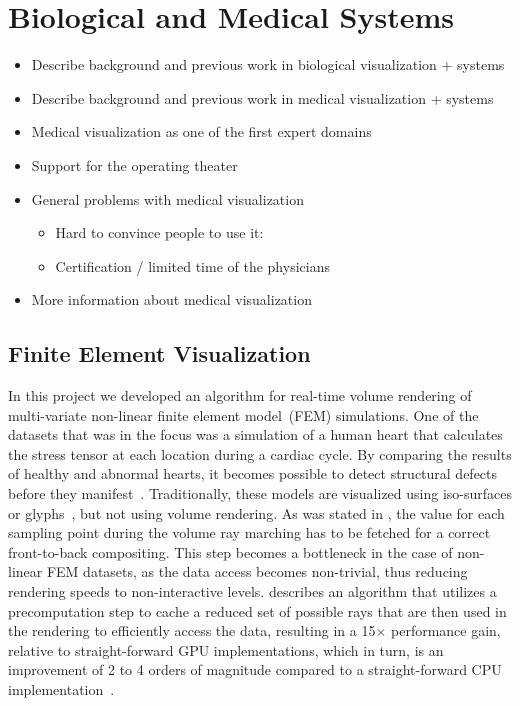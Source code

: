 \section{Biological and Medical Systems}
\label{contributions:medbio}
\begin{itemize}
\item Describe background and previous work in biological visualization + systems
\item Describe background and previous work in medical visualization + systems
\item Medical visualization as one of the first expert domains
\item Support for the operating theater
\item General problems with medical visualization
\begin{itemize}
    \item Hard to convince people to use it:
    \item Certification / limited time of the physicians
\end{itemize}
\item More information about medical visualization \cite{preim2007visualization}
\end{itemize}

\subsection{Finite Element Visualization}
\label{contributions:medbio:fem}
In this project we developed an algorithm for real-time volume rendering of multi-variate non-linear finite element model~(FEM) simulations. One of the datasets that was in the focus was a simulation of a human heart that calculates the stress tensor at each location during a cardiac cycle. By comparing the results of healthy and abnormal hearts, it becomes possible to detect structural defects before they manifest~\cite{young1992three, young1995tracking}. Traditionally, these models are visualized using iso-surfaces or glyphs~\cite{wunsche2003visualization}, but not using volume rendering. As was stated in , the value for each sampling point during the volume ray marching has to be fetched for a correct front-to-back compositing. This step becomes a bottleneck in the case of non-linear FEM datasets, as the data access becomes non-trivial, thus reducing rendering speeds to non-interactive levels.  describes an algorithm that utilizes a precomputation step to cache a reduced set of possible rays that are then used in the rendering to efficiently access the data, resulting in a 15$\times$ performance gain, relative to straight-forward GPU implementations, which in turn, is an improvement of 2 to 4 orders of magnitude compared to a straight-forward CPU implementation~\cite{Liu12Fem}. 

